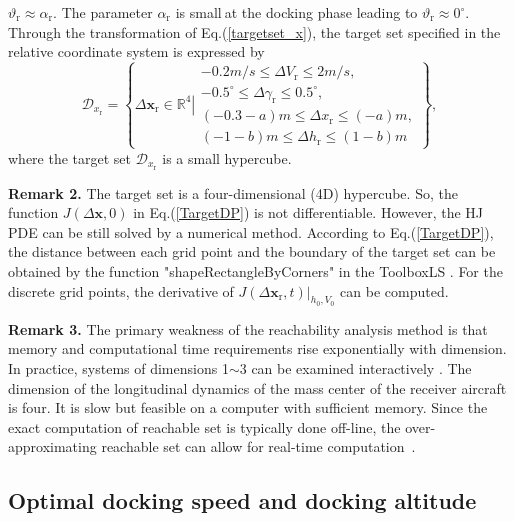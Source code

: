 $\vartheta_\text{r}\approx \alpha_\text{r}$. The parameter $\alpha_\text{r}$ is small$\ $at
the docking phase leading to $\vartheta_\text{r}\approx0^{\circ}.$ Through the
transformation of Eq.(\ref{targetset_x}), the target set specified in the
relative coordinate system is expressed by
\begin{equation}
\mathcal{D}_{x_\text{r}}=\left\{ \left.\Delta\mathbf{x}_\text{r}\mathbf{\in}%
\mathbb{R}%
^{4}\right\vert \begin{array}{l}
-0.2{m}/{s}\leq\Delta V_\text{r}\leq2{m}/{s},\\
-{{0.5}^{\circ}}\leq\Delta\gamma_\text{r}\leq{{0.5}^{\circ}},\\
(-0.3-a)m\leq\Delta x_\text{r}\leq(-a)m,\\
(-1-b)m\leq\Delta h_\text{r}\leq(1-b)m
\end{array}\right\} ,\label{33}
\end{equation}
where the target set $\mathcal{D}_{x_\text{r}}$ is a small hypercube.

\textbf{Remark 2. }The target set is a four-dimensional (4D) hypercube. So,
the function ${J}(\Delta \mathbf{x,}0)$ in Eq.(\ref{TargetDP}) is not
differentiable. However, the HJ PDE can be still solved by a numerical
method. According to Eq.(\ref{TargetDP}), the distance between each grid
point and the boundary of the target set can be obtained by the function
"shapeRectangleByCorners" in the ToolboxLS \cite{20}. For the discrete grid
points, the derivative of $J(\Delta \mathbf{x}_\text{r},t)|_{h_{0},V_{0}}$ can be
computed.

\textbf{Remark 3. }The primary weakness of the reachability analysis method
is that memory and computational time requirements rise exponentially with
dimension. In practice, systems of dimensions 1$\sim$3 can be
examined interactively \cite{14}. The dimension of the longitudinal dynamics
of the mass center of the receiver aircraft is four. It is slow but feasible
on a computer with sufficient memory. Since the exact computation of
reachable set is typically done off-line, the over-approximating reachable
set can allow for real-time computation\ \cite{15}.

\subsection{Optimal docking speed and docking altitude}

